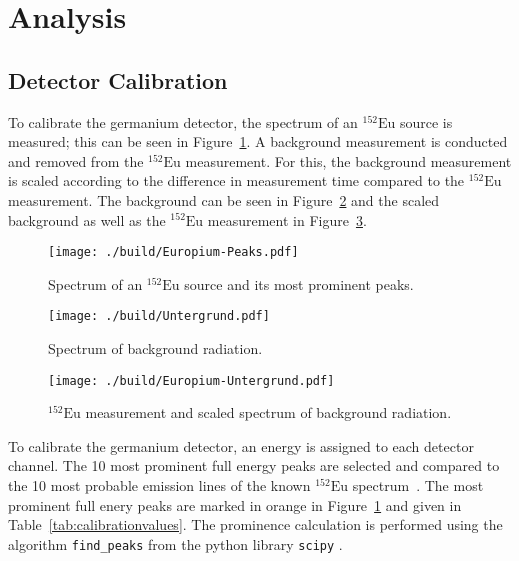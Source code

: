 \section{Analysis}
\subsection{Detector Calibration}
To calibrate the germanium detector, the spectrum of an $^{152}\text{Eu}$
source is measured; this can be seen in Figure~\ref{fig:spectrumeu}. A
background measurement is conducted and removed from the $^{152}\text{Eu}$
measurement. For this, the background measurement is scaled according to
the difference in measurement time compared to the $^{152}\text{Eu}$
measurement. The background can be seen in Figure~\ref{fig:background} and
the scaled background as well as the $^{152}\text{Eu}$ measurement in
Figure~\ref{fig:eubackground}.
\begin{figure}
	\centering
	\begin{adjustbox}{width=1.4\textwidth, center}
		\texttt{[image: ./build/Europium-Peaks.pdf]}
	\end{adjustbox}
	\caption{Spectrum of an $^{152}\text{Eu}$ source and its most prominent peaks.}
	\label{fig:spectrumeu}
\end{figure}
\begin{figure}
	\centering
	\begin{adjustbox}{width=1.4\textwidth, center}
		\texttt{[image: ./build/Untergrund.pdf]}
	\end{adjustbox}
	\caption{Spectrum of background radiation.}
	\label{fig:background}
\end{figure}
\begin{figure}
	\centering
	\begin{adjustbox}{width=1.4\textwidth, center}
		\texttt{[image: ./build/Europium-Untergrund.pdf]}
	\end{adjustbox}
	\caption{$^{152}\text{Eu}$ measurement and scaled spectrum of background radiation.}
	\label{fig:eubackground}
\end{figure}
\noindent
To calibrate the germanium detector, an energy is assigned to each detector channel.
The 10 most prominent full energy peaks are selected and compared to the 10 most probable emission
lines of the known $^{152}\text{Eu}$ spectrum~\cite{laraweb}. The most prominent full enery peaks are marked in
orange in Figure~\ref{fig:spectrumeu} and given in Table~\ref{tab:calibrationvalues}. The prominence
calculation is performed using the algorithm \texttt{find\_peaks} from the python library \texttt{scipy} \cite{scipy}.

